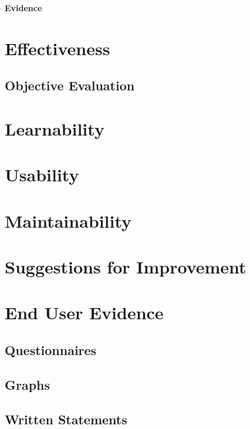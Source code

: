 \textbf{Evidence}





\section{Effectiveness}

\subsection{Objective Evaluation}

\section{Learnability}

\section{Usability}

\section{Maintainability}

\section{Suggestions for Improvement}

\section{End User Evidence}

\subsection{Questionnaires}

\subsection{Graphs}

\subsection{Written Statements}
